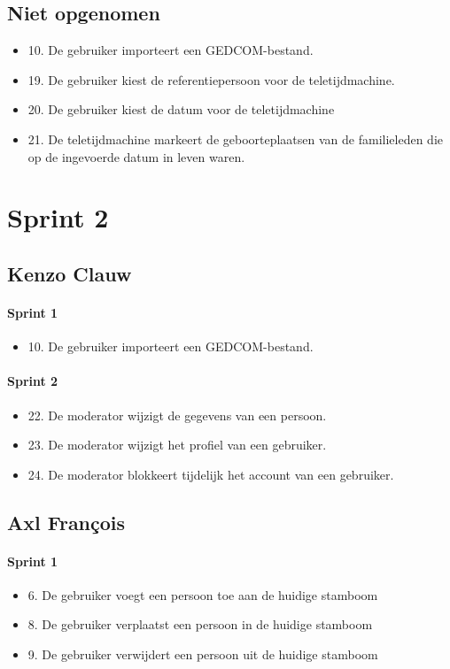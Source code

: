 \documentclass[pdftex,a4paper,12pt,twoside]{report}
\begin{document}
\subsection{Niet opgenomen}
\begin{itemize}
\item 10. De gebruiker importeert een GEDCOM-bestand. 
\item 19. De gebruiker kiest de referentiepersoon voor de teletijdmachine. 
\item 20. De gebruiker kiest de datum voor de teletijdmachine
\item 21. De teletijdmachine markeert de geboorteplaatsen van de familieleden die op de ingevoerde 
datum in leven waren. 
\end{itemize}

\section{Sprint 2}

\subsection{Kenzo Clauw}
\paragraph{Sprint 1}
\begin{itemize}
\item 10. De gebruiker importeert een GEDCOM-bestand. 
\end{itemize}
\paragraph{Sprint 2}
\begin{itemize}
\item 22. De moderator wijzigt de gegevens van een persoon. 
\item 23. De moderator wijzigt het profiel van een gebruiker. 
\item 24. De moderator blokkeert tijdelijk het account van een gebruiker. 
\end{itemize}

\subsection{Axl François}
\paragraph{Sprint 1}
\begin{itemize}
\item 6. De gebruiker voegt een persoon toe aan de huidige stamboom 
\item 8. De gebruiker verplaatst een persoon in de huidige stamboom 
\item 9. De gebruiker verwijdert een persoon uit de huidige stamboom
\end{itemize}
\end{document}

